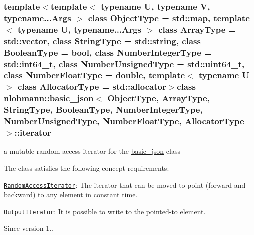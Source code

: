 \subsubsection*{template$<$template$<$ typename U, typename V, typename...\-Args $>$ class Object\-Type = std\-::map, template$<$ typename U, typename...\-Args $>$ class Array\-Type = std\-::vector, class String\-Type = std\-::string, class Boolean\-Type = bool, class Number\-Integer\-Type = std\-::int64\-\_\-t, class Number\-Unsigned\-Type = std\-::uint64\-\_\-t, class Number\-Float\-Type = double, template$<$ typename U $>$ class Allocator\-Type = std\-::allocator$>$class nlohmann\-::basic\-\_\-json$<$ Object\-Type, Array\-Type, String\-Type, Boolean\-Type, Number\-Integer\-Type, Number\-Unsigned\-Type, Number\-Float\-Type, Allocator\-Type $>$\-::iterator}

a mutable random access iterator for the \hyperlink{classnlohmann_1_1basic__json}{basic\-\_\-json} class 

The class satisfies the following concept requirements\-:
\begin{DoxyItemize}
\item \href{http://en.cppreference.com/w/cpp/concept/RandomAccessIterator}{\tt Random\-Access\-Iterator}\-: The iterator that can be moved to point (forward and backward) to any element in constant time.
\item \href{http://en.cppreference.com/w/cpp/concept/OutputIterator}{\tt Output\-Iterator}\-: It is possible to write to the pointed-\/to element.
\end{DoxyItemize}

\begin{DoxySince}{Since}
version 1.. 
\end{DoxySince}


